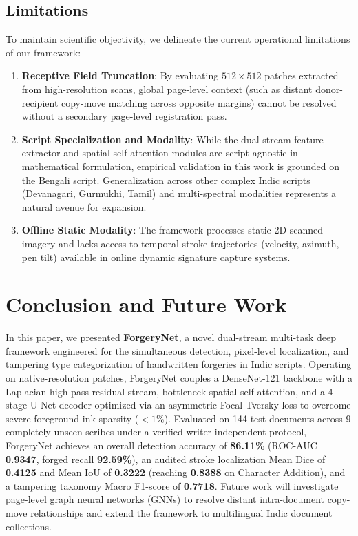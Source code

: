 \documentclass[pdflatex,sn-mathphys-num,iicol]{sn-jnl}
\begin{document}
\subsection{Limitations}\label{subsec:limitations}
To maintain scientific objectivity, we delineate the current operational limitations of our framework:
\begin{enumerate}[1.]
    \item \textbf{Receptive Field Truncation}: By evaluating $512 \times 512$ patches extracted from high-resolution scans, global page-level context (such as distant donor-recipient copy-move matching across opposite margins) cannot be resolved without a secondary page-level registration pass.
    \item \textbf{Script Specialization and Modality}: While the dual-stream feature extractor and spatial self-attention modules are script-agnostic in mathematical formulation, empirical validation in this work is grounded on the Bengali script. Generalization across other complex Indic scripts (Devanagari, Gurmukhi, Tamil) and multi-spectral modalities represents a natural avenue for expansion.
    \item \textbf{Offline Static Modality}: The framework processes static 2D scanned imagery and lacks access to temporal stroke trajectories (velocity, azimuth, pen tilt) available in online dynamic signature capture systems.
\end{enumerate}

\section{Conclusion and Future Work}\label{sec:conclusion}
In this paper, we presented \textbf{ForgeryNet}, a novel dual-stream multi-task deep framework engineered for the simultaneous detection, pixel-level localization, and tampering type categorization of handwritten forgeries in Indic scripts. Operating on native-resolution patches, ForgeryNet couples a DenseNet-121 backbone with a Laplacian high-pass residual stream, bottleneck spatial self-attention, and a 4-stage U-Net decoder optimized via an asymmetric Focal Tversky loss to overcome severe foreground ink sparsity ($<1\%$). Evaluated on 144 test documents across 9 completely unseen scribes under a verified writer-independent protocol, ForgeryNet achieves an overall detection accuracy of \textbf{86.11\%} (ROC-AUC \textbf{0.9347}, forged recall \textbf{92.59\%}), an audited stroke localization Mean Dice of \textbf{0.4125} and Mean IoU of \textbf{0.3222} (reaching \textbf{0.8388} on Character Addition), and a tampering taxonomy Macro F1-score of \textbf{0.7718}. Future work will investigate page-level graph neural networks (GNNs) to resolve distant intra-document copy-move relationships and extend the framework to multilingual Indic document collections.
\end{document}
